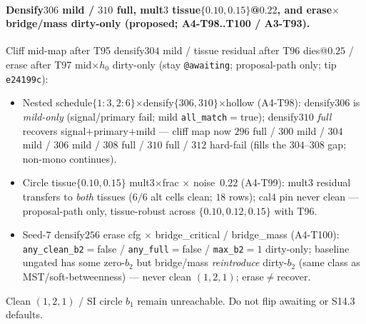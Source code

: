 \documentclass[11pt]{article}
\begin{document}
\paragraph{Densify$306$ mild / $310$ full, mult$3$ tissue$\{0.10,0.15\}$@$0.22$,
and erase$\times$bridge/mass dirty-only (proposed; A4-T98..T100 / A3-T93).}
Cliff mid-map after T95 densify$304$ mild / tissue residual after T96
dies@$0.25$ / erase after T97 mid$\times h_0$ dirty-only (stay
\texttt{@awaiting}; proposal-path only; tip \texttt{e24199c}):
\begin{itemize}[leftmargin=1.5em]
  \item Nested schedule$\{1{:}3,2{:}6\}$$\times$densify$\{306,310\}$$\times$hollow
  (A4-T98): densify$306$ is \emph{mild-only} (signal/primary fail; mild
  \texttt{all\_match}${=}$true); densify$310$ \emph{full} recovers
  signal$+$primary$+$mild --- cliff map now $296$ full / $300$ mild /
  $304$ mild / $306$ mild / $308$ full / $310$ full / $312$ hard-fail
  (fills the $304$--$308$ gap; non-mono continues).
  \item Circle tissue$\{0.10,0.15\}$ mult$3$$\times$frac $\times$ noise~$0.22$
  (A4-T99): mult$3$ residual transfers to \emph{both} tissues
  ($6/6$ alt cells clean; $18$ rows); cal$4$ pin never clean ---
  proposal-path only, tissue-robust across $\{0.10,0.12,0.15\}$ with T96.
  \item Seed-$7$ densify$256$ erase cfg $\times$ bridge\_critical /
  bridge\_mass (A4-T100): \texttt{any\_clean\_b2}${=}$false /
  \texttt{any\_full}${=}$false / \texttt{max\_b2}${=}1$ dirty-only;
  baseline ungated has some zero-$b_2$ but bridge/mass \emph{reintroduce}
  dirty-$b_2$ (same class as MST/soft-betweenness) --- never clean
  $(1,2,1)$; erase$\neq$recover.
\end{itemize}
Clean $(1,2,1)$ / SI circle $b_1$ remain unreachable. Do not flip
awaiting or S14.3 defaults.
\end{document}
